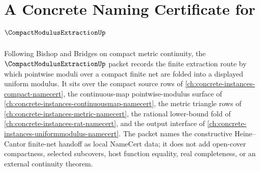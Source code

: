 \chapter{A Concrete Naming Certificate for $\CompactModulusExtractionUp$}
\label{ch:concrete-instances-compact-modulus-extraction-namecert}

Following Bishop and Bridges on compact metric continuity, the $\CompactModulusExtractionUp$ packet records the finite extraction route by which pointwise moduli over a compact finite net are folded into a displayed uniform modulus. It sits over the compact source rows of \autoref{ch:concrete-instances-compact-namecert}, the continuous-map pointwise-modulus surface of \autoref{ch:concrete-instances-continuousmap-namecert}, the metric triangle rows of \autoref{ch:concrete-instances-metric-namecert}, the rational lower-bound fold of \autoref{ch:concrete-instances-rat-namecert}, and the output interface of \autoref{ch:concrete-instances-uniformmodulus-namecert}. The packet names the constructive Heine--Cantor finite-net handoff as local NameCert data; it does not add open-cover compactness, selected subcovers, host function equality, real completeness, or an external continuity theorem.


